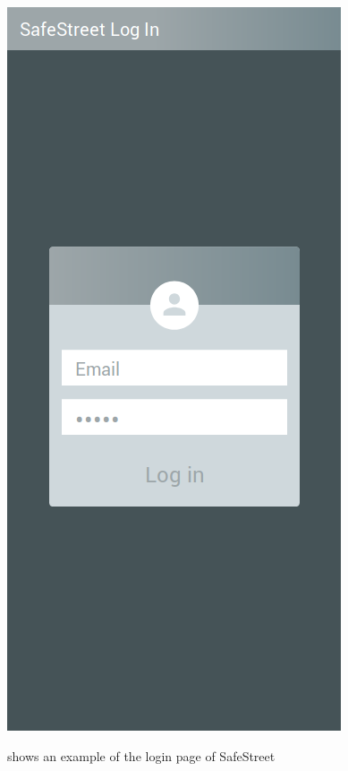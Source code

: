 \documentclass[../RASD.tex]{subfiles}
\begin{document}
    \begin{figure}[H]
        \centering
        \includegraphics[scale = 0.4]{assets/login.png}\\[1.6 cm]
        \caption[\textit{User} Login \textit{Mockup}]{shows an example of the login page of SafeStreet}
    \end{figure}
\end{document}
